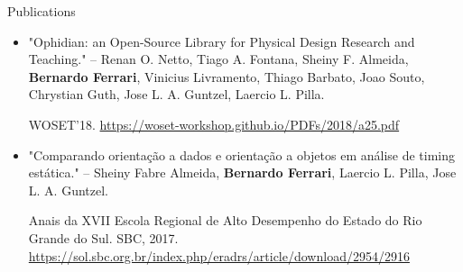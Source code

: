 \documentclass[calibri]{mcdowellcv}
\begin{document}
	\begin{cvsection}{Publications}
		\begin{cvsubsection}{}{}{}
			\begin{itemize}
				\item "Ophidian: an Open-Source Library for Physical Design Research and Teaching." -- Renan O. Netto, Tiago A. Fontana, Sheiny F. Almeida, \textbf{Bernardo Ferrari}, Vinicius Livramento, Thiago Barbato, Joao Souto, Chrystian Guth, Jose L. A. Guntzel, Laercio L. Pilla.

				WOSET'18. \url{https://woset-workshop.github.io/PDFs/2018/a25.pdf}

				\item "Comparando orientação a dados e orientação a objetos em análise de timing estática." -- Sheiny Fabre Almeida, \textbf{Bernardo Ferrari}, Laercio L. Pilla, Jose L. A. Guntzel.

				Anais da XVII Escola Regional de Alto Desempenho do Estado do Rio Grande do Sul. SBC, 2017. \url{https://sol.sbc.org.br/index.php/eradrs/article/download/2954/2916}
			\end{itemize}
		\end{cvsubsection}
	\end{cvsection}
\end{document}
